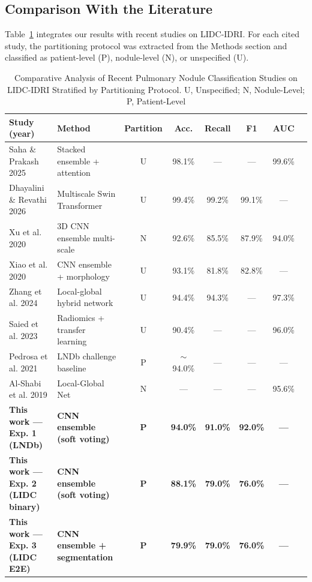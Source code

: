 \documentclass{ieeeaccess}
\begin{document}
\subsection{Comparison With the Literature}
Table~\ref{tab:literature} integrates our results with recent studies on LIDC-IDRI. For each cited study, the partitioning protocol was extracted from the Methods section and classified as patient-level (P), nodule-level (N), or unspecified (U).

\begin{table}[!t]
\caption{Comparative Analysis of Recent Pulmonary Nodule Classification Studies on LIDC-IDRI Stratified by Partitioning Protocol. U, Unspecified; N, Nodule-Level; P, Patient-Level}
\label{tab:literature}
\centering
\begin{tabular}{@{}llcccccc@{}}
\toprule
\textbf{Study (year)} & \textbf{Method} & \textbf{Partition} & \textbf{Acc.} & \textbf{Recall} & \textbf{F1} & \textbf{AUC} \\
\midrule
Saha \& Prakash 2025 \cite{liu2024} & Stacked ensemble + attention & U & 98.1\% & --- & --- & 99.6\% \\
Dhayalini \& Revathi 2026 \cite{dhayalini2026} & Multiscale Swin Transformer & U & 99.4\% & 99.2\% & 99.1\% & --- \\
Xu et al. 2020 \cite{xu2020} & 3D CNN ensemble multi-scale & N & 92.6\% & 85.5\% & 87.9\% & 94.0\% \\
Xiao et al. 2020 \cite{xiao2020} & CNN ensemble + morphology & U & 93.1\% & 81.8\% & 82.8\% & --- \\
Zhang et al. 2024 \cite{zhang2024} & Local-global hybrid network & U & 94.4\% & 94.3\% & --- & 97.3\% \\
Saied et al. 2023 \cite{mahbod2023} & Radiomics + transfer learning & U & 90.4\% & --- & --- & 96.0\% \\
Pedrosa et al. 2021 \cite{pedrosa2021} & LNDb challenge baseline & P & $\sim$94.0\% & --- & --- & --- \\
Al-Shabi et al. 2019 \cite{alshabi2019} & Local-Global Net & N & --- & --- & --- & 95.6\% \\
\textbf{This work --- Exp. 1 (LNDb)} & \textbf{CNN ensemble (soft voting)} & \textbf{P} & \textbf{94.0\%} & \textbf{91.0\%} & \textbf{92.0\%} & \textbf{---} \\
\textbf{This work --- Exp. 2 (LIDC binary)} & \textbf{CNN ensemble (soft voting)} & \textbf{P} & \textbf{88.1\%} & \textbf{79.0\%} & \textbf{76.0\%} & \textbf{---} \\
\textbf{This work --- Exp. 3 (LIDC E2E)} & \textbf{CNN ensemble + segmentation} & \textbf{P} & \textbf{79.9\%} & \textbf{79.0\%} & \textbf{76.0\%} & \textbf{---} \\
\bottomrule
\end{tabular}
\end{table}
\end{document}
